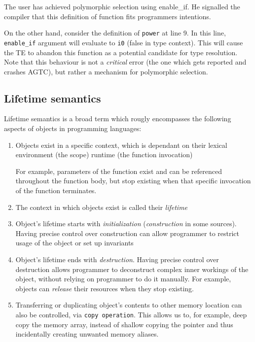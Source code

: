 \documentclass[times, utf8, diplomski]{fer}
\theoremstyle{definition}
\begin{document}
The user has achieved polymorphic selection using enable\_if. He signalled the compiler that this
definition of  function fits programmers intentions.

On the other hand, consider the definition of \texttt{power} at line 9.
In this line, \texttt{enable\_if} argument will evaluate to \texttt{i0} (false in type context).
This will cause the TE to abandon this function as a potential candidate for type resolution.
Note that this behaviour is not a \textit{critical} error (the one which gets reported and crashes AGTC),
but rather a mechanism for polymorphic selection.

\subsection{Lifetime semantics}

Lifetime semantics is a broad term which rougly encompasses the following aspects of objects
in programming languages:

\begin{enumerate}
    \item Objects exist in a specific context, which is dependant on their 
        \subitem lexical environment (the scope)
        \subitem runtime (the function invocation)

        For example, parameters of the function exist and can be referenced throughout the function body,
        but stop existing when that specific invocation of the function terminates. 

    \item The context in which objects exist is called their \textit{lifetime}
    \item Object's lifetime starts with \textit{initialization} (\textit{construction} in some sources).
        \subitem Having precise control over construction can allow programmer
                to restrict usage of the object or set up invariants
    \item Object's lifetime ends with \textit{destruction}.
        Having precise control over destruction allows programmer to
        deconstruct complex inner workings of the object, without relying on programmer to do it manually.
        For example, objects can \textit{release} their resources when they stop existing.
    \item Transferring or duplicating object's contents to other memory location can also be controlled,
        via \texttt{copy operation}. This allows us to, for example, deep copy the memory array, 
        instead of shallow copying the pointer and thus incidentally creating unwanted memory aliases.
\end{enumerate}
\end{document}
